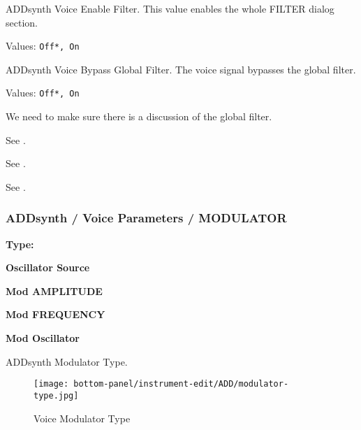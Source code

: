    \setcounter{ItemCounter}{0}      %

   ADDsynth Voice Enable Filter.
   This value enables the whole FILTER dialog section.

   Values: \texttt{Off*, On}

   ADDsynth Voice Bypass Global Filter.
   The voice signal bypasses the global filter.

   Values: \texttt{Off*, On}

   We need to make sure there is a discussion of the global filter.

   See .

   See .

   See .

\subsubsection{ADDsynth / Voice Parameters / MODULATOR}
\label{subsubsec:addsynth_voice_parameters_modulator}

   \begin{enumber}
      \item \textbf{Type:}
      \item \textbf{Oscillator Source}
      \item \textbf{Mod AMPLITUDE}
      \item \textbf{Mod FREQUENCY}
      \item \textbf{Mod Oscillator}
   \end{enumber}

   \setcounter{ItemCounter}{0}      %

   ADDsynth Modulator Type.

\begin{figure}[H]
   \centering 
   \texttt{[image: bottom-panel/instrument-edit/ADD/modulator-type.jpg]}
   \caption{Voice Modulator Type}
   \label{fig:voice_modulator_type}
\end{figure}

